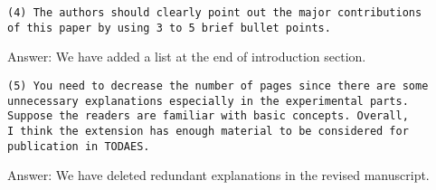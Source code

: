 \begin{verbatim}
(4) The authors should clearly point out the major contributions
of this paper by using 3 to 5 brief bullet points.
\end{verbatim}

Answer: We have added a list at the end of introduction section.


\begin{verbatim}
(5) You need to decrease the number of pages since there are some
unnecessary explanations especially in the experimental parts.
Suppose the readers are familiar with basic concepts. Overall,
I think the extension has enough material to be considered for
publication in TODAES.
\end{verbatim}

Answer: We have deleted redundant explanations in the revised manuscript.

